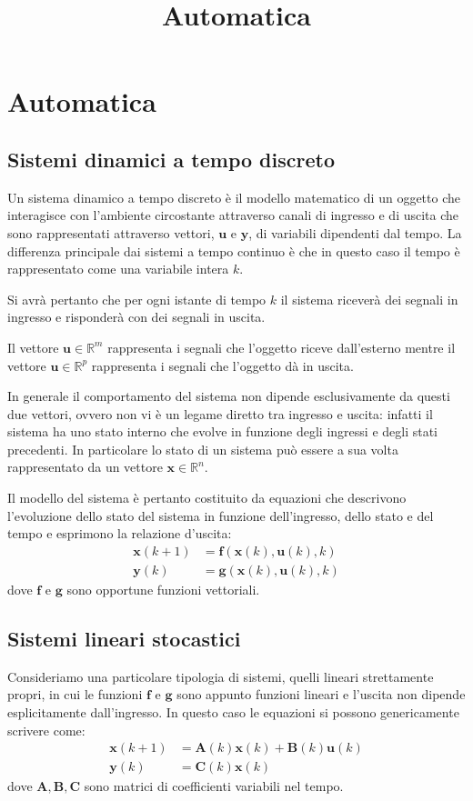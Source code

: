 \documentclass[12pt,a4paper]{article}
\title{Automatica}
\newcommand*{\matr}{\mathbf}
\newcommand*{\vett}{\mathbf}
\begin{document}
\section{Automatica}
\subsection{Sistemi dinamici a tempo discreto}

Un sistema dinamico a tempo discreto è il modello matematico di un oggetto che interagisce con l’ambiente circostante attraverso canali di ingresso e di uscita che sono rappresentati attraverso vettori, $\vett{u}$ e $\vett{y}$, di variabili dipendenti dal tempo. La differenza principale dai sistemi a tempo continuo è che in questo caso il tempo è rappresentato come una variabile intera $k$.

Si avrà pertanto che per ogni istante di tempo $k$ il sistema riceverà dei segnali in ingresso e risponderà con dei segnali in uscita.

Il vettore $\vett{u} \in \mathbb{R}^m$ rappresenta i segnali che l’oggetto riceve dall’esterno mentre il vettore $\vett{u} \in \mathbb{R}^p$ rappresenta i segnali che l’oggetto dà in uscita.

In generale il comportamento del sistema non dipende esclusivamente da questi due vettori, ovvero non vi è un legame diretto tra ingresso e uscita: infatti il sistema ha uno stato interno che evolve in funzione degli ingressi e degli stati precedenti. In particolare lo stato di un sistema può essere a sua volta rappresentato da un vettore $\vett{x} \in \mathbb{R}^n$.

Il modello del sistema è pertanto costituito da equazioni che descrivono l’evoluzione dello stato del sistema in funzione dell’ingresso, dello stato e del tempo e esprimono la relazione d'uscita:
\begin{align*}
\vett{x}(k+1) &= \vett{f}(\vett{x}(k),\vett{u}(k),k) \\
\vett{y}(k) &= \vett{g}(\vett{x}(k),\vett{u}(k),k)
\end{align*}
dove $\vett{f}$ e $\vett{g}$ sono opportune funzioni vettoriali.

\subsection{Sistemi lineari stocastici}
Consideriamo una particolare tipologia di sistemi, quelli lineari strettamente propri, in cui le funzioni $\vett{f}$ e $\vett{g}$ sono appunto funzioni lineari e l’uscita non dipende esplicitamente dall’ingresso. In questo caso le equazioni si possono genericamente scrivere come:
\begin{align*}
\vett{x}(k+1) &= \matr{A}(k)\vett{x}(k) + \matr{B}(k)\vett{u}(k) \\
\vett{y}(k) &= \matr{C}(k)\vett{x}(k)
\end{align*}
dove $\matr{A},\matr{B},\matr{C}$ sono matrici di coefficienti variabili nel tempo.
\end{document}
